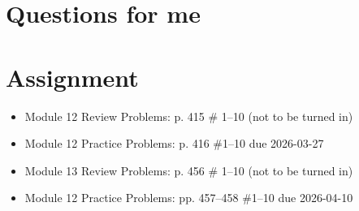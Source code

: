 \documentclass[10pt, oneside]{article}   	%
\begin{document}
\section*{Questions for me}

\section*{Assignment}
\begin{itemize}
\item Module 12 Review Problems: p. 415 \# 1--10 (not to be turned in)
\item Module 12 Practice Problems: p. 416 \#1--10 due 2026-03-27
\item Module 13 Review Problems: p. 456 \# 1--10 (not to be turned in)
\item Module 12 Practice Problems: pp. 457--458 \#1--10 due 2026-04-10
\end{itemize}
\end{document}
